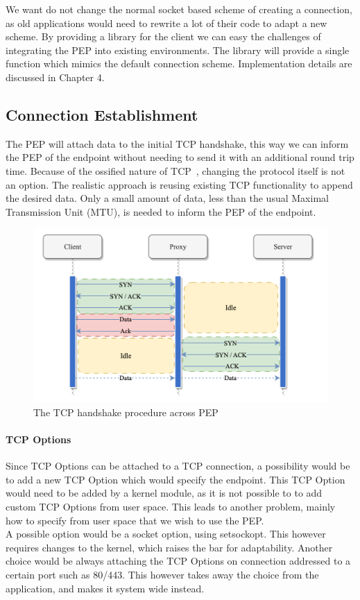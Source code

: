 \documentclass[a4paper,english, 11pt]{report}
\begin{document}
We want do not change the normal socket based scheme of creating a connection, as old applications would need to rewrite a lot of their code to adapt a new scheme. By providing a library for the client we can easy the challenges of integrating the PEP into existing environments. The library will provide a single function which mimics the default connection scheme. Implementation details are discussed in Chapter 4.

\subsection{Connection Establishment}  
The PEP will attach data to the initial TCP handshake, this way we can inform the PEP of the endpoint without needing to send it with an additional round trip time. Because of the ossified nature of TCP~\cite{tcp_extendable}, changing the protocol itself is not an option. The realistic approach is reusing existing TCP functionality to append the desired data. Only a small amount of data, less than the usual Maximal Transmission Unit (MTU), is needed to inform the PEP of the endpoint.

\begin{figure} %
	\centering
	\includegraphics[scale=0.75]{../diagrams/drawio/tcphandshake_primitiv.png}
  	\caption{The TCP handshake procedure across PEP}
  	\label{fig:tcphandshake_primitiv}
\end{figure}

\paragraph{TCP Options}
Since TCP Options can be attached to a TCP connection, a possibility would be to add a new TCP Option which would specify the endpoint. This TCP Option would need to be added by a kernel module, as it is not possible to to add custom TCP Options from user space. This leads to another problem, mainly how to specify from user space that we wish to use the PEP.\\
A possible option would be a socket option, using setsockopt. This however requires changes to the kernel, which raises the bar for adaptability. Another choice would be always attaching the TCP Options on connection addressed to a certain port such as 80/443. This however takes away the choice from the application, and makes it system wide instead.\\
\end{document}
